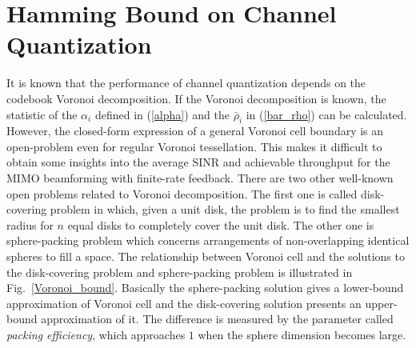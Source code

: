 \documentclass[conference]{IEEEtran}
\begin{document}
\section{Hamming Bound on Channel Quantization}
\begin{figure}
\end{figure}
It is known that the performance of channel quantization depends
on the codebook Voronoi decomposition. If the Voronoi
decomposition is known, the statistic of the $\alpha_i$ defined in
(\ref{alpha}) and the $\bar\rho_{i}$ in (\ref{bar_rho}) can be
calculated. However, the closed-form expression of a general
Voronoi cell boundary is an open-problem even for regular Voronoi
tessellation. This makes it difficult to obtain some insights into
the average SINR and achievable throughput for the MIMO
beamforming with finite-rate feedback. There are two other
well-known open problems related to Voronoi decomposition. The
first one is called disk-covering problem in which, given a unit
disk, the problem is to find the smallest radius for $n$ equal
disks to completely cover the unit disk. The other one is
sphere-packing problem which concerns arrangements of
non-overlapping identical spheres to fill a space. The
relationship between Voronoi cell and the solutions to the
disk-covering problem and sphere-packing problem is illustrated in
Fig.~\ref{Voronoi_bound}. Basically the sphere-packing solution
gives a lower-bound approximation of Voronoi cell and the
disk-covering solution presents an upper-bound approximation of
it. The difference is measured by the parameter called {\em
packing efficiency}, which approaches $1$ when the sphere
dimension becomes large.
\end{document}
